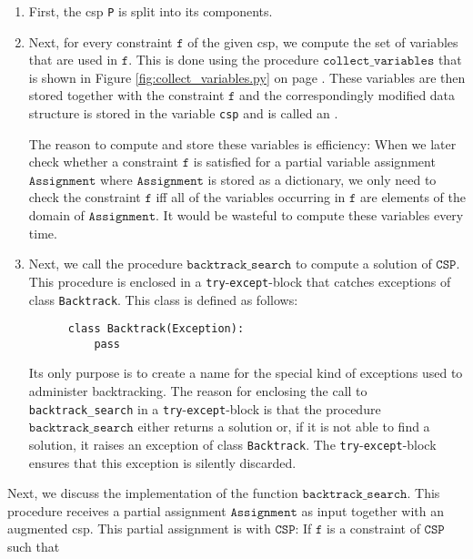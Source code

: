 \begin{enumerate}
\item First, the \ac{csp} \texttt{P} is split into its components.
\item Next, for every constraint $\texttt{f}$ of the given \ac{csp}, we compute the set of variables that
      are used in $\texttt{f}$.  This is done using the procedure $\texttt{collect\_variables}$ that is shown in
      Figure \ref{fig:collect_variables.py} on page \pageref{fig:collect_variables.py}.
      These variables are then stored together with the constraint $\texttt{f}$ and
      the correspondingly modified data structure is stored in the variable \texttt{csp} and is called an
      .

      The reason to compute and store these variables is efficiency: When we later check whether a constraint $\texttt{f}$
      is satisfied for a partial variable assignment $\texttt{Assignment}$ where $\texttt{Assignment}$ is
      stored as a dictionary, we only need to check the constraint $\texttt{f}$ iff all of the variables occurring
      in $\texttt{f}$ are elements of the domain of $\texttt{Assignment}$.   It would be wasteful to compute
      these variables every time.
\item Next, we call the procedure $\texttt{backtrack\_search}$ to compute a solution of $\texttt{CSP}$.
      This procedure is enclosed in a \texttt{try}-\texttt{except}-block that catches exceptions of class
      \texttt{Backtrack}.  This class is defined as follows:
      
\begin{verbatim}
      class Backtrack(Exception):
          pass
\end{verbatim}
      Its only purpose is to create a name for the special kind of exceptions used to administer backtracking.
      The reason for enclosing the call to \texttt{backtrack\_search} in a \texttt{try}-\texttt{except}-block
      is that the procedure $\texttt{backtrack\_search}$ either returns a solution or, if it is not
      able to find a solution, it raises an exception of class \texttt{Backtrack}.
      The \texttt{try}-\texttt{except}-block ensures that this exception is silently discarded.
\end{enumerate}
Next, we discuss the implementation of the function $\texttt{backtrack\_search}$.  This procedure receives a partial assignment
$\texttt{Assignment}$ as input together with an augmented \ac{csp}.  This partial assignment is
 with $\texttt{CSP}$:  If $\texttt{f}$ is a constraint of $\texttt{CSP}$ such that
